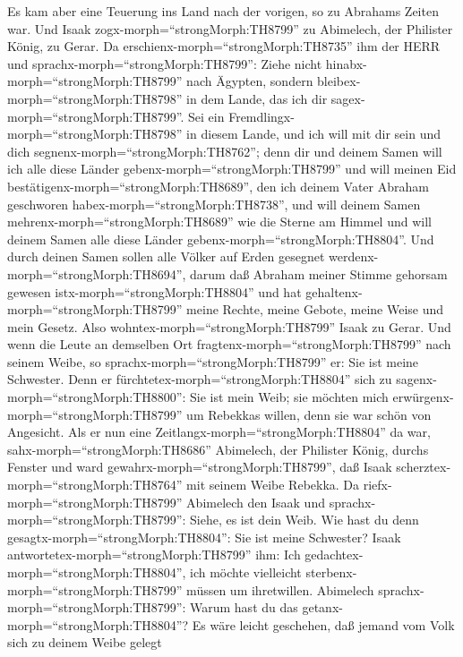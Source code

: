  Es kam aber eine Teuerung ins Land nach der vorigen, so zu
Abrahams Zeiten war. Und Isaak zogx-morph=``strongMorph:TH8799'' zu
Abimelech, der Philister König, zu Gerar.  Da
erschienx-morph=``strongMorph:TH8735'' ihm der HERR und
sprachx-morph=``strongMorph:TH8799'': Ziehe nicht
hinabx-morph=``strongMorph:TH8799'' nach Ägypten, sondern
bleibex-morph=``strongMorph:TH8798'' in dem Lande, das ich dir
sagex-morph=``strongMorph:TH8799''.  Sei ein
Fremdlingx-morph=``strongMorph:TH8798'' in diesem Lande, und ich will
mit dir sein und dich segnenx-morph=``strongMorph:TH8762''; denn dir und
deinem Samen will ich alle diese Länder
gebenx-morph=``strongMorph:TH8799'' und will meinen Eid
bestätigenx-morph=``strongMorph:TH8689'', den ich deinem Vater Abraham
geschworen habex-morph=``strongMorph:TH8738'',  und will
deinem Samen mehrenx-morph=``strongMorph:TH8689'' wie die Sterne am
Himmel und will deinem Samen alle diese Länder
gebenx-morph=``strongMorph:TH8804''. Und durch deinen Samen sollen alle
Völker auf Erden gesegnet werdenx-morph=``strongMorph:TH8694'',
 darum daß Abraham meiner Stimme gehorsam gewesen
istx-morph=``strongMorph:TH8804'' und hat
gehaltenx-morph=``strongMorph:TH8799'' meine Rechte, meine Gebote, meine
Weise und mein Gesetz.  Also
wohntex-morph=``strongMorph:TH8799'' Isaak zu Gerar.  Und
wenn die Leute an demselben Ort fragtenx-morph=``strongMorph:TH8799''
nach seinem Weibe, so sprachx-morph=``strongMorph:TH8799'' er: Sie ist
meine Schwester. Denn er fürchtetex-morph=``strongMorph:TH8804'' sich zu
sagenx-morph=``strongMorph:TH8800'': Sie ist mein Weib; sie möchten mich
erwürgenx-morph=``strongMorph:TH8799'' um Rebekkas willen, denn sie war
schön von Angesicht.  Als er nun eine
Zeitlangx-morph=``strongMorph:TH8804'' da war,
sahx-morph=``strongMorph:TH8686'' Abimelech, der Philister König, durchs
Fenster und ward gewahrx-morph=``strongMorph:TH8799'', daß Isaak
scherztex-morph=``strongMorph:TH8764'' mit seinem Weibe Rebekka.
 Da riefx-morph=``strongMorph:TH8799'' Abimelech den Isaak
und sprachx-morph=``strongMorph:TH8799'': Siehe, es ist dein Weib. Wie
hast du denn gesagtx-morph=``strongMorph:TH8804'': Sie ist meine
Schwester? Isaak antwortetex-morph=``strongMorph:TH8799'' ihm: Ich
gedachtex-morph=``strongMorph:TH8804'', ich möchte vielleicht
sterbenx-morph=``strongMorph:TH8799'' müssen um ihretwillen.
 Abimelech sprachx-morph=``strongMorph:TH8799'': Warum hast
du das getanx-morph=``strongMorph:TH8804''? Es wäre leicht geschehen,
daß jemand vom Volk sich zu deinem Weibe gelegt
